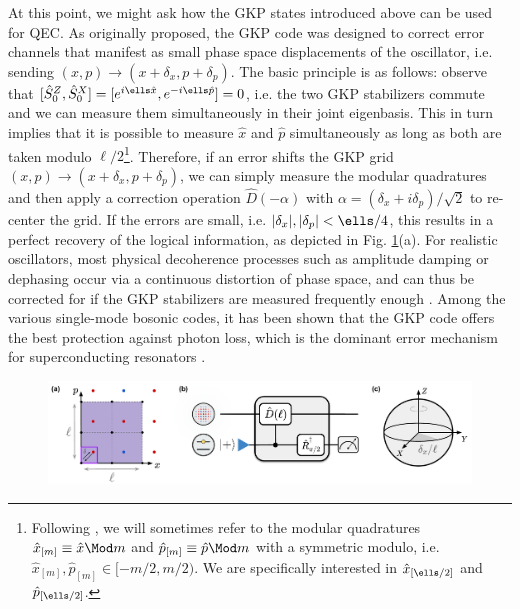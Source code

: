 At this point, we might ask how the GKP states introduced above can be used for QEC. As originally proposed, the GKP code was designed to correct error channels that manifest as small phase space displacements of the oscillator, i.e. sending $(x, p) \to (x + \delta_x, p+\delta_p)$. The basic principle is as follows: observe that $[\hat{S}_0^Z, \hat{S}_0^X] = [e^{i\ells\hat{x}}, e^{-i\ells\hat{p}}] = 0$, i.e. the two GKP stabilizers commute and we can measure them simultaneously in their joint eigenbasis. This in turn implies that it is possible to measure $\hat{x}$ and $\hat{p}$ simultaneously as long as both are taken modulo $\ell/2$\footnote{Following \cite{royer2020gkp}, we will sometimes refer to the modular quadratures $\hat{x}_{[m]} \equiv \hat{x} \Mod m$ and $\hat{p}_{[m]} \equiv \hat{p} \Mod m$ with a symmetric modulo, i.e. $\hat{x}_{[m]}, \hat{p}_{[m]} \in [-m/2, m/2)$. We are specifically interested in $\hat{x}_{[\ells/2]}$ and $\hat{p}_{[\ells/2]}$.}. Therefore, if an error shifts the GKP grid $(x, p) \to (x + \delta_x, p+\delta_p)$, we can simply measure the modular quadratures and then apply a correction operation $\hat{D}(-\alpha)$ with $\alpha = (\delta_x + i\delta_p)/\sqrt{2}$ to re-center the grid. If the errors are small, i.e. $|\delta_x|, |\delta_p| < \ells / 4$, this results in a perfect recovery of the logical information, as depicted in Fig. \ref{fig:2-GKP-Ideal-QEC}(a). For realistic oscillators, most physical decoherence processes such as amplitude damping or dephasing occur via a continuous distortion of phase space, and can thus be corrected for if the GKP stabilizers are measured frequently enough \cite{gottesman2001gkp, glancy2006gkperror, albert2018performance-and-structure, noh2018performance-and-structure-pt2}. Among the various single-mode bosonic codes, it has been shown that the GKP code offers the best protection against photon loss, which is the dominant error mechanism for superconducting resonators \cite{albert2018performance-and-structure}. 
\begin{figure}[h]
    \centering
    \includegraphics[width=\linewidth]{Figures/2/GKP Ideal QEC.pdf}
    \caption{}
    \label{fig:2-GKP-Ideal-QEC}
\end{figure}

